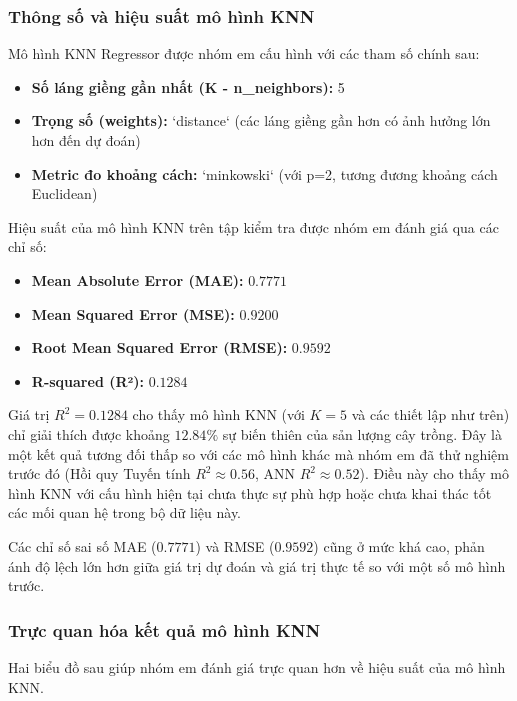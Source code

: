 \subsubsection{Thông số và hiệu suất mô hình KNN}
\label{subsubsec:knn_parameters_metrics}

Mô hình KNN Regressor được nhóm em cấu hình với các tham số chính sau:
\begin{itemize}
    \item \textbf{Số láng giềng gần nhất (K - n\_neighbors):} 5
    \item \textbf{Trọng số (weights):} `distance` (các láng giềng gần hơn có ảnh hưởng lớn hơn đến dự đoán)
    \item \textbf{Metric đo khoảng cách:} `minkowski` (với p=2, tương đương khoảng cách Euclidean)
\end{itemize}

Hiệu suất của mô hình KNN trên tập kiểm tra được nhóm em đánh giá qua các chỉ số:
\begin{itemize}
    \item \textbf{Mean Absolute Error (MAE):} $0.7771$
    \item \textbf{Mean Squared Error (MSE):} $0.9200$
    \item \textbf{Root Mean Squared Error (RMSE):} $0.9592$
    \item \textbf{R-squared (R²):} $0.1284$
\end{itemize}

Giá trị $R^2 = 0.1284$ cho thấy mô hình KNN (với $K=5$ và các thiết lập như trên) chỉ giải thích được khoảng $12.84\%$ sự biến thiên của sản lượng cây trồng. Đây là một kết quả tương đối thấp so với các mô hình khác mà nhóm em đã thử nghiệm trước đó (Hồi quy Tuyến tính $R^2 \approx 0.56$, ANN $R^2 \approx 0.52$). Điều này cho thấy mô hình KNN với cấu hình hiện tại chưa thực sự phù hợp hoặc chưa khai thác tốt các mối quan hệ trong bộ dữ liệu này.

Các chỉ số sai số MAE ($0.7771$) và RMSE ($0.9592$) cũng ở mức khá cao, phản ánh độ lệch lớn hơn giữa giá trị dự đoán và giá trị thực tế so với một số mô hình trước.

\subsubsection{Trực quan hóa kết quả mô hình KNN}
\label{subsubsec:knn_visualization}

Hai biểu đồ sau giúp nhóm em đánh giá trực quan hơn về hiệu suất của mô hình KNN.

